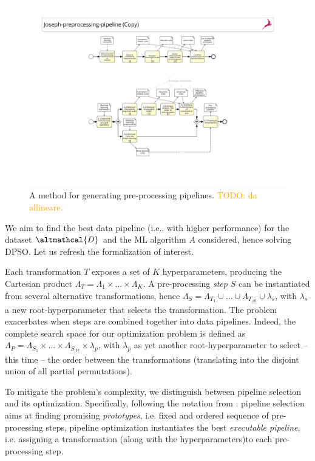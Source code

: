 \begin{figure}[t]
    \centering
    \includegraphics[clip, trim=6.5cm 3.5cm 6.5cm 8cm,width=1.0\textwidth]{chapters/data-centric/supervised/img/bpmn.pdf}
    \caption{A method for generating pre-processing pipelines. \textcolor{orange}{TODO: da allineare.}}
    \label{effective-fig:methodology}
\end{figure}


We aim to find the best data pipeline (i.e., with higher performance) for the dataset $\altmathcal{D}$ and the ML algorithm $A$ considered, hence solving DPSO.
Let us refresh the formalization of interest.

Each transformation $T$ exposes a set of $K$ hyperparameters, producing the Cartesian product $\Lambda_T = \Lambda_1 \times \dots \times \Lambda_K$.
A pre-processing \textit{step} $S$ can be instantiated from several alternative transformations, hence $\Lambda_S = \Lambda_{T_1} \cup \ldots \cup \Lambda_{T_{|S|}} \cup \lambda_s$, with $\lambda_s$ a new root-hyperparameter that selects the transformation.
The problem exacerbates when steps are combined together into data pipelines.
Indeed, the complete search space for our optimization problem is defined as $\Lambda_P = \Lambda_{S_1} \times \ldots \times \Lambda_{S_{|P|}} \times \lambda_p$, with $\lambda_p$ as yet another root-hyperparameter to select -- this time -- the order between the transformations (translating into the disjoint union of all partial permutations).

To mitigate the problem's complexity, we distinguish between pipeline selection and its optimization.
Specifically, following the notation from \cite{Quemy20InfSystems}:
pipeline selection aims at finding promising \textit{prototypes}, i.e. fixed and ordered sequence of pre-processing steps, pipeline optimization instantiates the best \textit{executable pipeline}, i.e. assigning a transformation (along with the hyperparameters)to each pre-processing step.

